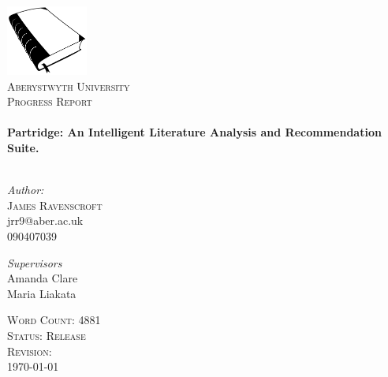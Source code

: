 \begin{titlepage}
 
\begin{center}

\includegraphics[width=0.20\textwidth]{../cover_logo.png}\\[1cm]
 
\textsc{\LARGE Aberystwyth University}\\[1.5cm]
 
\textsc{\LARGE Progress Report}\\[0.5cm]
 
 
\HRule \\[0.4cm]
{ \huge \bfseries Partridge: An Intelligent Literature Analysis and
Recommendation Suite.}\\[0.4cm]

\HRule \\[1.5cm]

\begin{minipage}{0.4\textwidth}
\begin{flushleft} \large
\emph{Author:}\\
\textsc{James Ravenscroft}\\
jrr9@aber.ac.uk\\
090407039 
\end{flushleft}
\end{minipage}
\begin{minipage}{0.4\textwidth}
\begin{flushright} \large
\emph{Supervisors} \\
Amanda Clare\\
Maria Liakata

\end{flushright}
\end{minipage}

\vfill
 
\textsc{\large Word Count: 4881}\\
\textsc{\large Status: Release}\\
\textsc{\large Revision: \Revision{} }\\
{\large \today}
 
\end{center}
 
\end{titlepage}

